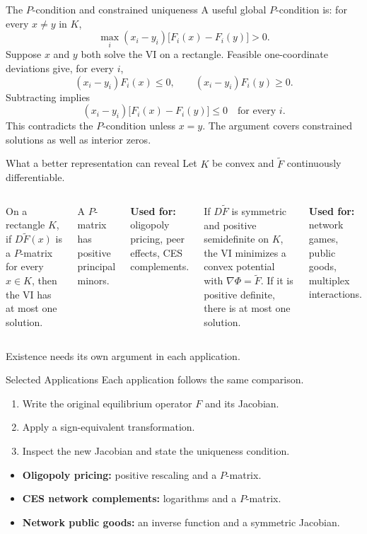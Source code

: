 \documentclass[11pt,aspectratio=169]{beamer}
\theoremstyle{plain}
\theoremstyle{definition}
\newcommand{\compactmath}{%
 \setlength{\abovedisplayskip}{4pt}\setlength{\belowdisplayskip}{4pt}%
 \setlength{\abovedisplayshortskip}{2pt}\setlength{\belowdisplayshortskip}{4pt}}
\begin{document}
\begin{frame}{The $P$-condition and constrained uniqueness}
\compactmath
A useful global $P$-condition is: for every $x\ne y$ in $K$,
\[
 \max_i (x_i-y_i)\bigl[F_i(x)-F_i(y)\bigr]>0.
\]
Suppose $x$ and $y$ both solve the VI on a rectangle.
Feasible one-coordinate deviations give, for every $i$,
\[
 (x_i-y_i)F_i(x)\leq0,\qquad
 (x_i-y_i)F_i(y)\geq0.
\]
Subtracting implies
\[
 (x_i-y_i)\bigl[F_i(x)-F_i(y)\bigr]\leq0\quad\text{for every }i.
\]
This contradicts the $P$-condition unless $x=y$.
The argument covers constrained solutions as well as interior zeros.
\end{frame}


\begin{frame}{What a better representation can reveal}
\compactmath
Let $K$ be convex and $\widetilde F$ continuously differentiable.
\begin{columns}[T,onlytextwidth]
\setcounter{theorem}{1}
\begin{lemma}
On a rectangle $K$, if $D\widetilde F(x)$ is a $P$-matrix for every $x\in K$,
then the VI has \alert{at most one} solution.
\end{lemma}
A $P$-matrix has positive principal minors.
\medskip\par
\textbf{Used for:} oligopoly pricing, peer effects, CES complements.
\setcounter{theorem}{2}
\begin{lemma}[Potential]
If $D\widetilde F$ is symmetric and positive semidefinite on $K$, the VI
minimizes a convex potential with $\nabla\Phi=\widetilde F$.
If it is positive definite, there is \alert{at most one} solution.
\end{lemma}
\textbf{Used for:} network games, public goods, multiplex interactions.
\end{columns}
\medskip
Existence needs its own argument in each application.
\end{frame}


\begin{frame}{Selected Applications}
Each application follows the same comparison.
\begin{enumerate}
 \item Write the original equilibrium operator $F$ and its Jacobian.
 \item Apply a sign-equivalent transformation.
 \item Inspect the new Jacobian and state the uniqueness condition.
\end{enumerate}
\medskip
\begin{itemize}
 \item \textbf{Oligopoly pricing:} positive rescaling and a $P$-matrix.
 \item \textbf{CES network complements:} logarithms and a $P$-matrix.
 \item \textbf{Network public goods:} an inverse function and a symmetric Jacobian.
\end{itemize}
\end{frame}
\end{document}
